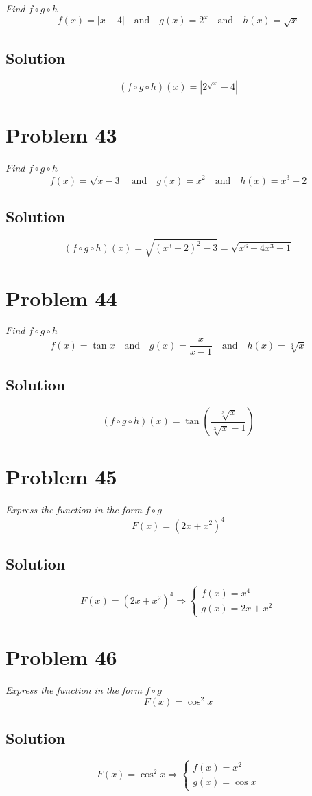 \documentclass[11pt]{article}
\newcommand{\soln}{\subsection*}
\newcommand{\qn}{\textit}
\begin{document}
\qn{Find $f \circ g \circ h$ $$f(x)=|x-4| \quad \text{and} \quad g(x)=2^x \quad \text{and} \quad h(x)=\sqrt{x}$$}

\soln{Solution}
$$(f \circ g \circ h)(x)=|2^{\sqrt{x}}-4|$$

\section*{Problem 43}

\qn{Find $f \circ g \circ h$ $$f(x)=\sqrt{x-3} \quad \text{and} \quad g(x)=x^2 \quad \text{and} \quad h(x)=x^3+2$$}

\soln{Solution}
$$(f \circ g \circ h)(x)=\sqrt{(x^3+2)^2-3}=\sqrt{x^6+4x^3+1}$$

\section*{Problem 44}

\qn{Find $f \circ g \circ h$ $$f(x)=\tan{x} \quad \text{and} \quad g(x)=\frac{x}{x-1} \quad \text{and} \quad h(x)=\sqrt[3]{x}$$}

\soln{Solution}
$$(f \circ g \circ h)(x)=\tan(\frac{\sqrt[3]{x}}{\sqrt[3]{x}-1})$$

\section*{Problem 45}

\qn{Express the function in the form $f \circ g$ $$F(x)=(2x+x^2)^4$$}

\soln{Solution}
\begin{equation*}
	F(x)=(2x+x^2)^4
	\Rightarrow
	\begin{cases}
		f(x) = x^4\\
		g(x) = 2x+x^2
	\end{cases}
\end{equation*}

\section*{Problem 46}

\qn{Express the function in the form $f \circ g$ $$F(x)=\cos^2{x}$$}

\soln{Solution}
\begin{equation*}
	F(x)=\cos^2{x}
	\Rightarrow
	\begin{cases}
		f(x) = x^2\\
		g(x) = \cos{x}
	\end{cases}
\end{equation*}
\end{document}

